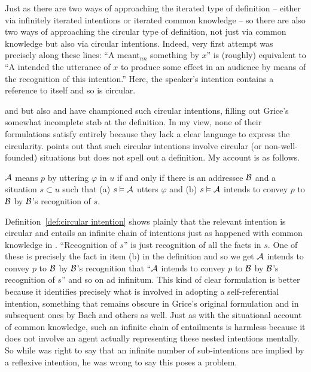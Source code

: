 
Just as there are two ways of approaching the iterated type of definition -- either via infinitely iterated intentions or iterated common knowledge -- so there are also two ways of approaching the circular type of definition, not just via common knowledge but also via  circular intentions. Indeed,  very first attempt was precisely along these lines: ``A meant$_{nn}$ something by $x$'' is (roughly) equivalent to ``A intended the utterance of $x$ to produce some effect in an audience by means of the recognition of this intention.'' Here, the speaker's intention contains a reference to itself and so is circular.

\citet{bh:lcsa} and \citet{bach:oci, bach:mc, bach:smi} but also \citet{searle:sa} and \citet{harman:schiffer, harman:cv} have championed such circular intentions, filling out Grice's somewhat incomplete stab at the definition. In my view, none of their formulations satisfy entirely because they lack a clear language to express the 
circularity. \citet[194--195]{barwise:ssafa}  points out that such circular intentions involve circular (or non-well-founded) situations but does not spell out a definition. My account is as follows.

\begin{definition}

$\cal A$ means $p$ by uttering $\varphi$ in $u$ if and only if there is an addressee $\cal B$ and a situation $s \subset u$ such that (a) $s \vDash {\cal A}$ utters $\varphi$ and (b) $s \vDash {\cal A}$ intends to convey $p$ to $\cal B$ by ${\cal B}$'s recognition of $s$.

\label{def:circular intention}

\end{definition}

Definition~\ref{def:circular intention} shows plainly that the relevant intention is circular and entails an infinite chain of intentions just as happened with common knowledge in . ``Recognition of $s$'' is just recognition of all the facts in $s$. One of these is precisely the fact in item (b) in the definition and so we get ${\cal A}$ intends to convey $p$ to $\cal B$ by ${\cal B}$'s recognition that ``${\cal A}$ intends to convey $p$ to $\cal B$ by ${\cal B}$'s recognition of $s$'' and so on ad infinitum. This kind of clear formulation is better because it identifies precisely what is involved in adopting a self-referential intention, something that remains obscure in Grice's original formulation and in subsequent ones by Bach and others as well. Just as with the situational account of common knowledge, such an infinite chain of entailments is harmless because it does not involve an agent actually representing these nested intentions mentally. So while \citet{recanati:odci} was right to say that an infinite number of sub-intentions are implied by a reflexive intention, he was wrong to say this poses a problem.

